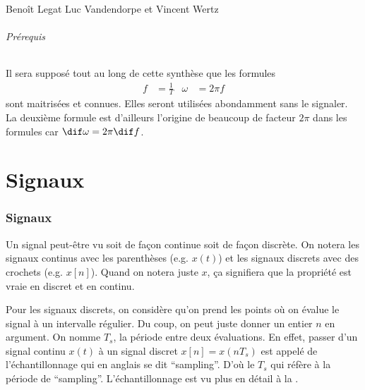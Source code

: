 

\usepackage{pgfplots}
\newcommand{\fourier}{\mathcal{F}}
\newcommand{\laplace}{\mathcal{L}}
\newcommand{\laplacu}{\mathcal{L}_u}
\newcommand{\transfz}{\mathcal{Z}}
\newcommand{\transzu}{\mathcal{Z}_u}
\newcommand{\roc}{\mathrm{ROC}}
\DeclareMathOperator{\cof}{cof}

\lstset{language=MATLAB}

{Beno\^it Legat}
{Luc Vandendorpe et Vincent Wertz}

\paragraph{Prérequis}
Il sera supposé tout au long de cette synthèse que les
formules
\begin{align*}
  f & = \frac{1}{T} & \omega & = 2\pi f
\end{align*}
sont maitrisées et connues.
Elles seront utilisées abondamment sans le signaler.
La deuxième formule est d'ailleurs l'origine de beaucoup
de facteur $2\pi$ dans les formules car $\dif\omega = 2\pi \dif f$.


\part{Signaux}
\section{Signaux}
Un signal peut-être vu soit de façon continue soit de façon discrète.
On notera les signaux continus avec les parenthèses (e.g. $x(t)$)
et les signaux discrets avec des crochets (e.g. $x[n]$).
Quand on notera juste $x$, ça signifiera que la propriété est vraie
en discret et en continu.

Pour les signaux discrets, on considère qu'on prend les points où on
évalue le signal à un intervalle régulier.
Du coup, on peut juste donner un entier $n$ en argument.
On nomme $T_s$, la période entre deux évaluations.
En effet, passer d'un signal continu $x(t)$ à un signal discret
$x[n] = x(nT_s)$ est appelé de l'échantillonnage qui en anglais se dit
``sampling''. D'où le $T_s$ qui réfère à la période de ``sampling''.
L'échantillonnage est vu plus en détail à la .

